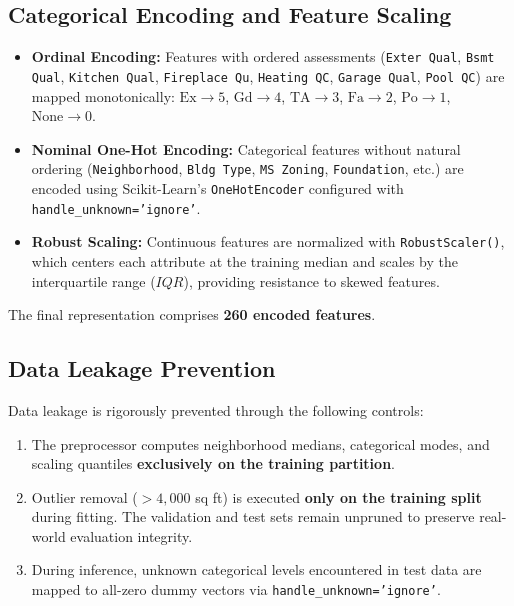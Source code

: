 \documentclass[11pt,a4paper]{article}
\begin{document}
\subsection{Categorical Encoding and Feature Scaling}
\begin{itemize}
    \item \textbf{Ordinal Encoding:} Features with ordered assessments (\texttt{Exter Qual}, \texttt{Bsmt Qual}, \texttt{Kitchen Qual}, \texttt{Fireplace Qu}, \texttt{Heating QC}, \texttt{Garage Qual}, \texttt{Pool QC}) are mapped monotonically: $\text{Ex} \to 5$, $\text{Gd} \to 4$, $\text{TA} \to 3$, $\text{Fa} \to 2$, $\text{Po} \to 1$, $\text{None} \to 0$.
    \item \textbf{Nominal One-Hot Encoding:} Categorical features without natural ordering (\texttt{Neighborhood}, \texttt{Bldg Type}, \texttt{MS Zoning}, \texttt{Foundation}, etc.) are encoded using Scikit-Learn's \texttt{OneHotEncoder} configured with \texttt{handle\_unknown='ignore'}.
    \item \textbf{Robust Scaling:} Continuous features are normalized with \texttt{RobustScaler()}, which centers each attribute at the training median and scales by the interquartile range ($IQR$), providing resistance to skewed features.
\end{itemize}
The final representation comprises \textbf{260 encoded features}.

\subsection{Data Leakage Prevention}
Data leakage is rigorously prevented through the following controls:
\begin{enumerate}
    \item The preprocessor computes neighborhood medians, categorical modes, and scaling quantiles \textbf{exclusively on the training partition}.
    \item Outlier removal ($>4,000$ sq ft) is executed \textbf{only on the training split} during fitting. The validation and test sets remain unpruned to preserve real-world evaluation integrity.
    \item During inference, unknown categorical levels encountered in test data are mapped to all-zero dummy vectors via \texttt{handle\_unknown='ignore'}.
\end{enumerate}
\end{document}

